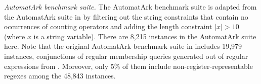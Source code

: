 \medskip
\noindent
\emph{AutomatArk benchmark suite.}
The AutomatArk benchmark suite is adapted from the AutomatArk suite in \cite{z3str3re} by filtering out the string constraints that contain no occurrences of counting operators and adding the length constraint $|x| > 10$ (where $x$ is a string variable). There are 8,215 instances in the AutomatArk suite here.
Note that the original AutomatArk benchmark suite in \cite{z3str3re} includes 19,979 instances, conjunctions of regular membership queries generated out of regular expressions from \cite{automatark}.
Moreover, only 5\% of them include non-register-representable regexes among the 48,843 instances.

